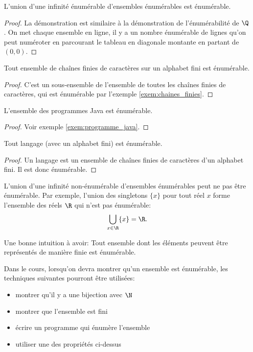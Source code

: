 \begin{myprop}
	L'union d'une infinité énumérable d'ensembles énumérables est énumérable.
    \begin{proof}
      La démonstration est similaire à la démonstration de l'énumérabilité de $\Q$.
      On met chaque ensemble en ligne, il y a un nombre énumérable de lignes qu'on peut numéroter en parcourant le tableau en diagonale montante en partant de $(0,0)$.
    \end{proof}
\end{myprop}

\begin{myprop}
 Tout ensemble de chaînes finies de caractères sur un alphabet fini est énumérable.
 \begin{proof}
C'est un sous-ensemble de l'ensemble de toutes les chaînes finies de caractères, qui est énumérable par l'exemple \ref{exem:chaines_finies}.
 \end{proof}
\end{myprop}

\begin{myprop}
 L'ensemble des programmes Java est énumérable.
 \begin{proof}
  Voir exemple \ref{exem:programme_java}.
 \end{proof}
\end{myprop}


\begin{myprop}
 Tout langage (avec un alphabet fini) est énumérable. 
 \begin{proof}
 Un langage est un ensemble de chaînes finies de caractères d'un alphabet fini.  Il est donc  énumérable.
 \end{proof}
\end{myprop}

L'union d'une infinité non-énumérable d'ensembles énumérables peut ne pas être énumérable.
Par exemple, l'union des singletons $\{x\}$ pour tout réel $x$ forme l'ensemble des réels $\R$ qui n'est pas énumérable:
\[ \bigcup_{x \in \R} \{x\} = \R. \]

\begin{myrem}
  Une bonne intuition à avoir:
  Tout ensemble dont les éléments peuvent être représentés de manière finie est énumérable.
\end{myrem}

Dans le cours, lorsqu'on devra montrer qu'un ensemble est énumérable,
les techniques suivantes pourront être utilisées:
\begin{itemize}
	\item montrer qu'il y a une bijection avec $\N$ 
	\item montrer que l'ensemble est fini
	\item écrire un programme qui énumère l'ensemble
	\item utiliser une des propriétés ci-dessus
\end{itemize}

